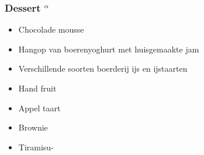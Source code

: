 \subsubsection*{Dessert $^{\alpha}$}
\begin{itemize}
	\item	Chocolade mousse
	\item	Hangop van boerenyoghurt met huisgemaakte jam
	\item	Verschillende soorten boerderij ijs en ijstaarten
	\item	Hand fruit
	\item	Appel taart
	\item	Brownie
	\item	Tiramisu-
\end{itemize}

